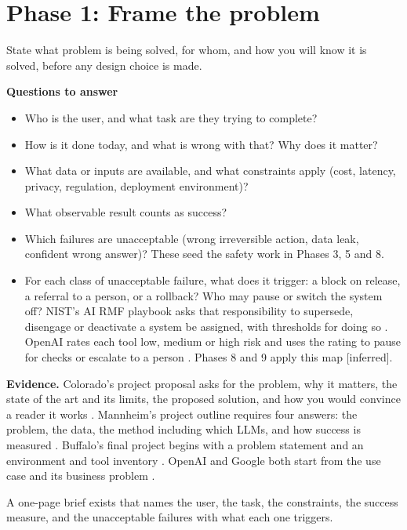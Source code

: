 \documentclass[10pt]{article}
\newcommand{\phase}[2]{\section*{Phase #1: #2}\addcontentsline{toc}{section}{Phase #1: #2}}
\newcommand{\inferred}{\textsf{\small[inferred]}}
\begin{document}
\phase{1}{Frame the problem}

\begin{goal}
State what problem is being solved, for whom, and how you will know it is solved, before any design choice is made.
\end{goal}

\textbf{Questions to answer}
\begin{itemize}
\item Who is the user, and what task are they trying to complete?
\item How is it done today, and what is wrong with that? Why does it matter?
\item What data or inputs are available, and what constraints apply (cost, latency, privacy, regulation, deployment environment)?
\item What observable result counts as success?
\item Which failures are unacceptable (wrong irreversible action, data leak, confident wrong answer)? These seed the safety work in Phases 3, 5 and 8.
\item For each class of unacceptable failure, what does it trigger: a block on release, a referral to a person, or a rollback? Who may pause or switch the system off? NIST's AI RMF playbook asks that responsibility to supersede, disengage or deactivate a system be assigned, with thresholds for doing so \cite[MANAGE~2.3--2.4]{nistmanage}. OpenAI rates each tool low, medium or high risk and uses the rating to pause for checks or escalate to a person \cite[p.~26]{openai}. Phases 8 and 9 apply this map \inferred.
\end{itemize}

\textbf{Evidence.}
Colorado's project proposal asks for the problem, why it matters, the state of the art and its limits, the proposed solution, and how you would convince a reader it works \cite{colorado}.
Mannheim's project outline requires four answers: the problem, the data, the method including which LLMs, and how success is measured \cite[slide~18]{mannheim}.
Buffalo's final project begins with a problem statement and an environment and tool inventory \cite{buffalo}.
OpenAI and Google both start from the use case and its business problem \cite[pp.~5--6]{openai}\cite[pp.~19--20]{gintro}.

\begin{gate}
A one-page brief exists that names the user, the task, the constraints, the success measure, and the unacceptable failures with what each one triggers.
\end{gate}
\end{document}
